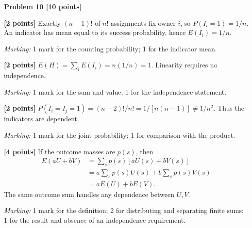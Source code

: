 \documentclass[12pt,letterpaper]{article}
\newcommand{\problemheading}[2][5\baselineskip]{\Needspace{#1}\par\noindent\hspace*{-0.625in}\textbf{#2}\par\nobreak\vspace{0.3em}}
\begin{document}
\vspace{0.65em}
\problemheading[\dimexpr 3\baselineskip+4\baselineskip\relax]{Problem 10 [10 points]}
\begin{description}[font=\normalfont,leftmargin=1.2em,labelsep=0.4em]
\item[(a)] \textbf{[2 points]} Exactly $(n-1)!$ of $n!$ assignments fix owner $i$, so $P(I_i=1)=1/n$. An indicator has mean equal to its success probability, hence $E(I_i)=1/n$.
\par\textit{Marking:} 1 mark for the counting probability; 1 for the indicator mean.
\item[(b)] \textbf{[2 points]} $E(H)=\sum_i E(I_i)=n(1/n)=1$. Linearity requires no independence.
\par\textit{Marking:} 1 mark for the sum and value; 1 for the independence statement.
\item[(c)] \textbf{[2 points]} $P(I_i=I_j=1)=(n-2)!/n!=1/[n(n-1)]\ne1/n^2$. Thus the indicators are dependent.
\par\textit{Marking:} 1 mark for the joint probability; 1 for comparison with the product.
\item[(d)] \textbf{[4 points]} If the outcome masses are $p(s)$, then\[\begin{aligned}E(aU+bV)&=\sum_s p(s)[aU(s)+bV(s)]\\&=a\sum_s p(s)U(s)+b\sum_s p(s)V(s)\\&=aE(U)+bE(V).\end{aligned}\]The same outcome sum handles any dependence between $U,V$.
\par\textit{Marking:} 1 mark for the definition; 2 for distributing and separating finite sums; 1 for the result and absence of an independence requirement.
\end{description}
\end{document}
